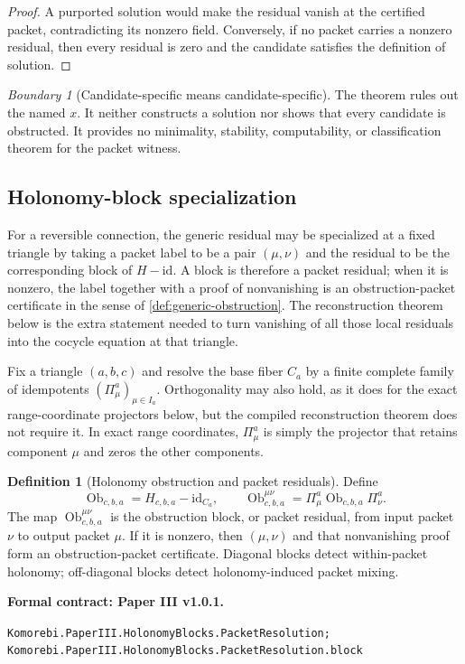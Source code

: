 \documentclass[11pt,a4paper]{article}
\theoremstyle{plain}
\theoremstyle{definition}
\newtheorem{definition}[definition]{Definition}
\theoremstyle{remark}
\newtheorem{boundary}[boundary]{Boundary}
\newcommand{\id}{\mathrm{id}}
\newcommand{\Ob}{\operatorname{Ob}}
\newcommand{\leanname}[1]{\nolinkurl{#1}}
\newcommand{\statusleanthree}[1]{\par\smallskip\noindent\begin{minipage}{\linewidth}{\color{leanblue}\textbf{Formal contract: Paper III v1.0.1.}}\par\begingroup\small\raggedright\leanname{#1}\par\endgroup\end{minipage}\par\smallskip}
\begin{document}
\begin{proof}
A purported solution would make the residual vanish at the certified packet,
contradicting its nonzero field.  Conversely, if no packet carries a nonzero
residual, then every residual is zero and the candidate satisfies the
definition of solution.
\end{proof}

\begin{boundary}[Candidate-specific means candidate-specific]
The theorem rules out the named $x$.  It neither constructs a solution nor
shows that every candidate is obstructed.  It provides no minimality,
stability, computability, or classification theorem for the packet witness.
\end{boundary}

\subsection{Holonomy-block specialization}

For a reversible connection, the generic residual may be specialized at a
fixed triangle by taking a packet label to be a pair $(\mu,\nu)$ and the
residual to be the corresponding block of $H-\id$.  A block is therefore a
packet residual; when it is nonzero, the label together with a proof of
nonvanishing is an obstruction-packet certificate in the sense of
\cref{def:generic-obstruction}.  The reconstruction theorem below is the extra
statement needed to turn vanishing of all those local residuals into the
cocycle equation at that triangle.

Fix a triangle $(a,b,c)$ and resolve the base fiber $C_a$ by a finite complete
family of idempotents $(\Pi^a_\mu)_{\mu\in I_a}$.  Orthogonality may also hold,
as it does for the exact range-coordinate projectors below, but the compiled
reconstruction theorem does not require it.  In exact range coordinates,
$\Pi^a_\mu$ is simply the projector that retains component $\mu$ and zeros
the other components.

\begin{definition}[Holonomy obstruction and packet residuals]
\label{def:obstruction-packet}
Define
\[
\Ob_{c,b,a}=H_{c,b,a}-\id_{C_a},
\qquad
\Ob^{\mu\nu}_{c,b,a}
=
\Pi^a_\mu\Ob_{c,b,a}\Pi^a_\nu.
\]
The map $\Ob^{\mu\nu}_{c,b,a}$ is the obstruction block, or packet residual,
from input packet $\nu$ to output packet $\mu$.  If it is nonzero, then
$(\mu,\nu)$ and that nonvanishing proof form an obstruction-packet
certificate.  Diagonal blocks detect within-packet holonomy; off-diagonal
blocks detect holonomy-induced packet mixing.
\end{definition}
\statusleanthree{Komorebi.PaperIII.HolonomyBlocks.PacketResolution; Komorebi.PaperIII.HolonomyBlocks.PacketResolution.block}
\end{document}
